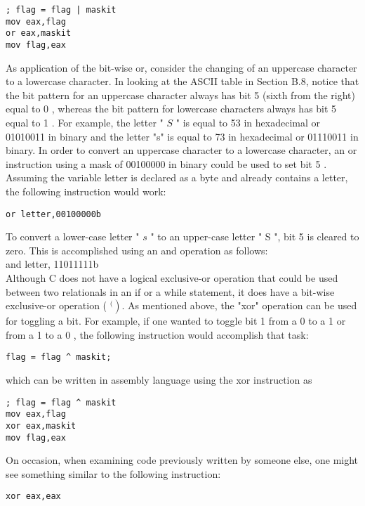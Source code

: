 \documentclass[10pt]{article}
\begin{document}
\begin{verbatim}
; flag = flag | maskit
mov eax,flag
or eax,maskit
mov flag,eax
\end{verbatim}

As application of the bit-wise or, consider the changing of an uppercase character to a lowercase character. In looking at the ASCII table in Section B.8, notice that the bit pattern for an uppercase character always has bit 5 (sixth from the right) equal to 0 , whereas the bit pattern for lowercase characters always has bit 5 equal to 1 . For example, the letter " $S$ " is equal to 53 in hexadecimal or 01010011 in binary and the letter "s" is equal to 73 in hexadecimal or 01110011 in binary. In order to convert an uppercase character to a lowercase character, an or instruction using a mask of 00100000 in binary could be used to set bit 5 . Assuming the variable letter is declared as a byte and already contains a letter, the following instruction would work:

\begin{verbatim}
or letter,00100000b
\end{verbatim}

To convert a lower-case letter " $s$ " to an upper-case letter " S ", bit 5 is cleared to zero. This is accomplished using an and operation as follows:\\
and letter, 11011111b\\
Although C does not have a logical exclusive-or operation that could be used between two relationals in an if or a while statement, it does have a bit-wise exclusive-or operation ( $\left.{ }^{( }\right)$. As mentioned above, the "xor" operation can be used for toggling a bit. For example, if one wanted to toggle bit 1 from a 0 to a 1 or from a 1 to a 0 , the following instruction would accomplish that task:

\begin{verbatim}
flag = flag ^ maskit;
\end{verbatim}

which can be written in assembly language using the xor instruction as

\begin{verbatim}
; flag = flag ^ maskit
mov eax,flag
xor eax,maskit
mov flag,eax
\end{verbatim}

On occasion, when examining code previously written by someone else, one might see something similar to the following instruction:

\begin{verbatim}
xor eax,eax
\end{verbatim}
\end{document}
